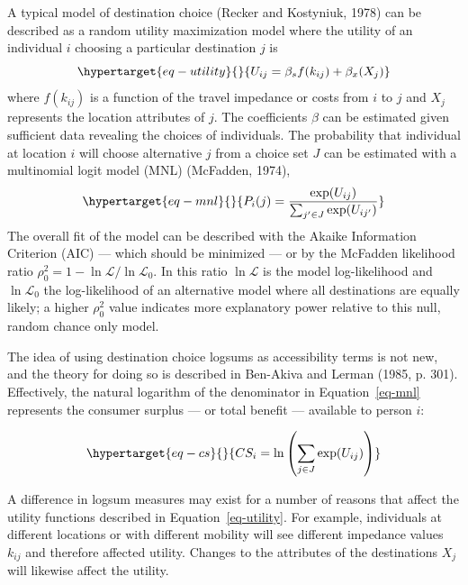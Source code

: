 \documentclass[
  letterpaper,
  DIV=11,
  numbers=noendperiod]{scrreport}
\begin{document}
A typical model of destination choice (Recker and Kostyniuk, 1978) can
be described as a random utility maximization model where the utility of
an individual \(i\) choosing a particular destination \(j\) is
\begin{equation}\protect\hypertarget{eq-utility}{}{ U_{ij} = \beta_{s}f(k_{ij}) + \beta_{x}(X_j) }\label{eq-utility}\end{equation}
where \(f(k_{ij})\) is a function of the travel impedance or costs from
\(i\) to \(j\) and \(X_{j}\) represents the location attributes of
\(j\). The coefficients \(\beta\) can be estimated given sufficient data
revealing the choices of individuals. The probability that individual at
location \(i\) will choose alternative \(j\) from a choice set \(J\) can
be estimated with a multinomial logit model (MNL) (McFadden, 1974),
\begin{equation}\protect\hypertarget{eq-mnl}{}{ P_i(j) = \frac{\exp(U_{ij})}{\sum_{j' \in J}{\exp(U_{ij'})}}}\label{eq-mnl}\end{equation}
The overall fit of the model can be described with the Akaike
Information Criterion (AIC) --- which should be minimized --- or by the
McFadden likelihood ratio
\(\rho^2_0 = 1 - \ln\mathcal{L} / \ln\mathcal{L}_0\). In this ratio
\(\ln{\mathcal{L}}\) is the model log-likelihood and
\(\ln{\mathcal{L}_0}\) the log-likelihood of an alternative model where
all destinations are equally likely; a higher \(\rho^2_0\) value
indicates more explanatory power relative to this null, random chance
only model.

The idea of using destination choice logsums as accessibility terms is
not new, and the theory for doing so is described in Ben-Akiva and
Lerman (1985, p. 301). Effectively, the natural logarithm of the
denominator in Equation~\ref{eq-mnl} represents the consumer surplus ---
or total benefit --- available to person \(i\):

\begin{equation}\protect\hypertarget{eq-cs}{}{ CS_i = \ln\left(\sum_{j \in J} \exp(U_{ij})\right)}\label{eq-cs}\end{equation}

A difference in logsum measures may exist for a number of reasons that
affect the utility functions described in Equation~\ref{eq-utility}. For
example, individuals at different locations or with different mobility
will see different impedance values \(k_{ij}\) and therefore affected
utility. Changes to the attributes of the destinations \(X_j\) will
likewise affect the utility.
\end{document}
